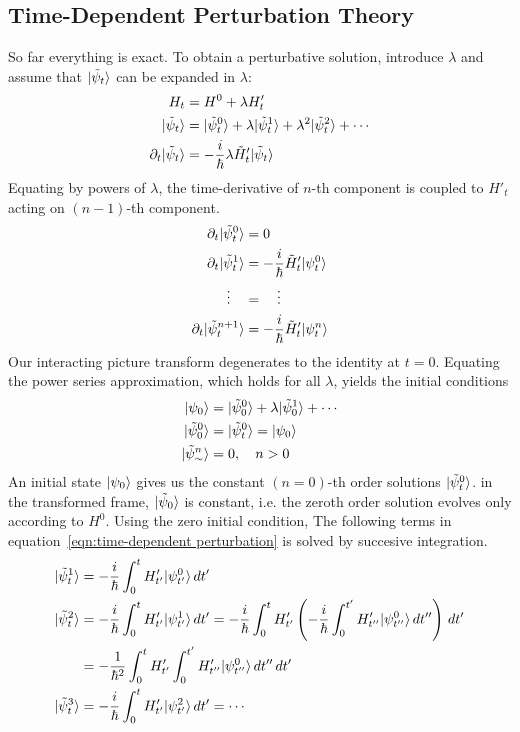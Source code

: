 \subsection{Time-Dependent Perturbation Theory}
So far everything is exact. To obtain a perturbative solution, introduce 
$\lambda$ and assume that $|\tilde \psi_t\rangle$ can be expanded in $\lambda$:
\[\begin{aligned}
    H_t &= H^0 + \lambda H'_t \\ 
    |\tilde \psi_t\rangle &= |\tilde \psi^0_t\rangle + \lambda |\tilde \psi^1_t\rangle + 
        \lambda^2|\tilde \psi^2_t\rangle + \cdots \\ 
    \partial_{t} |\tilde \psi_t\rangle &= -\dfrac i {\hbar} \lambda \tilde H'_t|\tilde \psi_t\rangle 
\end{aligned}\] 
Equating by powers of $\lambda$, the time-derivative of $n$-th component is coupled to 
$H'_t$ acting on $(n-1)$-th component. 
\begin{equation}\begin{aligned}\label{eqn:time-dependent perturbation}
    \partial_{t} |\tilde \psi^0_t\rangle &= 0 \\ 
    \partial_{t} |\tilde \psi^1_t\rangle &= -\dfrac i {\hbar} \tilde H'_t|\psi^0_t\rangle \\ 
    \vdots \quad &= \quad \vdots \\ 
    \partial_{t} |\tilde \psi^{n+1}_t\rangle &= -\dfrac i {\hbar} \tilde H'_t|\psi^n_t\rangle 
\end{aligned}\end{equation}
Our interacting picture transform degenerates to the identity at $t=0$. 
Equating the power series approximation, which holds for all $\lambda$, 
yields the initial conditions 
\begin{equation}\begin{aligned}
    |\psi_0\rangle &= |\tilde \psi^0_0\rangle + \lambda |\tilde \psi^1_0\rangle + \cdots \\ 
    |\tilde \psi^0_0\rangle &= |\tilde \psi_t^0\rangle = |\psi_0\rangle \\ 
    |\tilde \psi^n_\sim\rangle &= 0, \quad n>0
\end{aligned}\end{equation}
An initial state $|\psi_0\rangle$ gives us the constant $(n=0)$-th order solutions $|\tilde \psi^0_t\rangle$. 
in the transformed frame, $|\tilde \psi_0\rangle$ is constant, i.e. the zeroth order 
solution evolves only according to $H^0$. 
Using the zero initial condition, 
The following terms in equation~\ref{eqn:time-dependent perturbation} is solved by 
succesive integration. 
\begin{equation}\begin{aligned}
    |\tilde \psi_t^1\rangle &= -\dfrac i {\hbar} \int_0^t H'_{t'} |\psi_{t'}^0\rangle \, dt' \\ 
    |\tilde \psi_t^2\rangle &= -\dfrac i {\hbar} \int_0^t H'_{t'} |\psi_{t'}^1\rangle \, dt'
    = -\dfrac i {\hbar} \int_0^t H'_{t'} \left(-\dfrac i {\hbar} \int_0^{t'} H'_{t''} |\psi_{t''}^0\rangle \, dt''\right) \, dt' \\ 
    &= -\dfrac 1 {\hbar^2}\int_0^t H'_{t'}\int_0^{t'} H'_{t''} |\psi_{t''}^0\rangle \, dt''\, dt' \\ 
    |\tilde \psi_t^3\rangle &= -\dfrac i {\hbar} \int_0^t H'_{t'}|\psi_{t'}^2\rangle\, dt' = \cdots 
\end{aligned}\end{equation}
